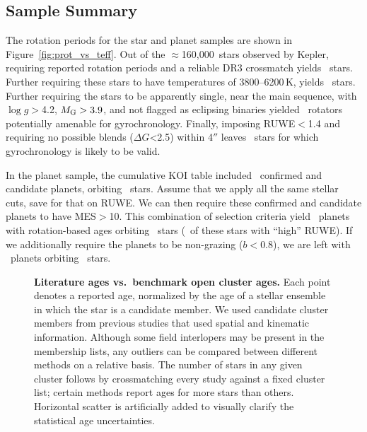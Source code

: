 \documentclass[11pt,twocolumn,tighten]{aastex63}
\newcommand{\nkeplerstars}{$\approx$160{,}000}
\begin{document}
\subsection{Sample Summary}
\label{subsec:tally}

The rotation periods for the star and planet samples are shown in
Figure~\ref{fig:prot_vs_teff}.  Out of the \nkeplerstars\ stars
observed by Kepler, requiring reported rotation periods and a reliable
DR3 crossmatch yields \nuniqstarsantosrot\ stars.  Further requiring
these stars to have temperatures of 3800--6200\,K, yields
\nuniqstarsantosrotteffcut\ stars.  Further requiring the stars to be
apparently single, near the main sequence, with $\log g$$>$4.2,
$M_{\rm G}>3.9$, and not flagged as eclipsing binaries yielded
\nuniqstarsantosallbutruwe\ rotators potentially amenable for
gyrochronology.  Finally, imposing RUWE$<$1.4 and requiring no
possible blends ($\Delta G$<2.5) within 4$''$ leaves
\nuniqstarsantosrotgyroappl\ stars for which gyrochronology is likely
to be valid.


In the planet sample, the cumulative KOI table included
\nnonfpcumkois\ confirmed and candidate planets, orbiting
\nnonfpcumkoihosts\ stars.  Assume that we apply all the same stellar
cuts, save for that on RUWE.  We can then require these confirmed and
candidate planets to have MES$>$10.  This combination of selection
criteria yield \nplwgyroagewithgrazingandhighruwe\ planets with
rotation-based ages orbiting
\nplhoststarwgyroagewithgrazingandhighruwe\ stars
(\nplhoststarwgyroagejusthighruwe\ of these stars with ``high'' RUWE).
If we additionally require the planets to be non-grazing ($b<0.8$), we
are left with \nplwgyroagenograzing\ planets orbiting
\nplhoststarwgyroagenograzing\ stars.



\begin{figure*}[!t]
	\begin{center}
	\end{center}
	\vspace{-0.5cm}
	\caption{
		{\bf Literature ages vs.~benchmark open cluster ages.}
		Each point denotes a reported age,
		normalized by the age of a stellar ensemble in which the star
		is a candidate member.
		We used candidate cluster members from previous studies that used spatial and kinematic
		information.  Although some field interlopers may be present in the 
		membership lists,
		any outliers can be compared between different methods on a
		relative basis.
		The number of stars in any given cluster follows by crossmatching every study against
		a fixed cluster list; certain methods report ages for more stars than others.
		Horizontal scatter is artificially added to visually
		clarify the statistical age uncertainties.
	}
	\label{fig:agescalecompone}
\end{figure*}
\end{document}
